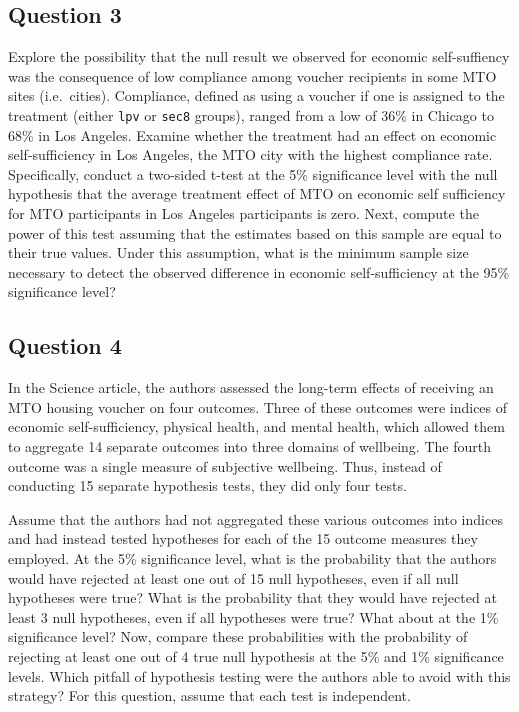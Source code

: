 \documentclass[]{article}
\begin{document}
\subsection{Question 3}\label{question-3}

Explore the possibility that the null result we observed for economic
self-suffiency was the consequence of low compliance among voucher
recipients in some MTO sites (i.e.~cities). Compliance, defined as using
a voucher if one is assigned to the treatment (either \texttt{lpv} or
\texttt{sec8} groups), ranged from a low of 36\% in Chicago to 68\% in
Los Angeles. Examine whether the treatment had an effect on economic
self-sufficiency in Los Angeles, the MTO city with the highest
compliance rate. Specifically, conduct a two-sided t-test at the 5\%
significance level with the null hypothesis that the average treatment
effect of MTO on economic self sufficiency for MTO participants in Los
Angeles participants is zero. Next, compute the power of this test
assuming that the estimates based on this sample are equal to their true
values. Under this assumption, what is the minimum sample size necessary
to detect the observed difference in economic self-sufficiency at the
95\% significance level?

\subsection{Question 4}\label{question-4}

In the Science article, the authors assessed the long-term effects of
receiving an MTO housing voucher on four outcomes. Three of these
outcomes were indices of economic self-sufficiency, physical health, and
mental health, which allowed them to aggregate 14 separate outcomes into
three domains of wellbeing. The fourth outcome was a single measure of
subjective wellbeing. Thus, instead of conducting 15 separate hypothesis
tests, they did only four tests.

Assume that the authors had not aggregated these various outcomes into
indices and had instead tested hypotheses for each of the 15 outcome
measures they employed. At the 5\% significance level, what is the
probability that the authors would have rejected at least one out of 15
null hypotheses, even if all null hypotheses were true? What is the
probability that they would have rejected at least 3 null hypotheses,
even if all hypotheses were true? What about at the 1\% significance
level? Now, compare these probabilities with the probability of
rejecting at least one out of 4 true null hypothesis at the 5\% and 1\%
significance levels. Which pitfall of hypothesis testing were the
authors able to avoid with this strategy? For this question, assume that
each test is independent.
\end{document}
